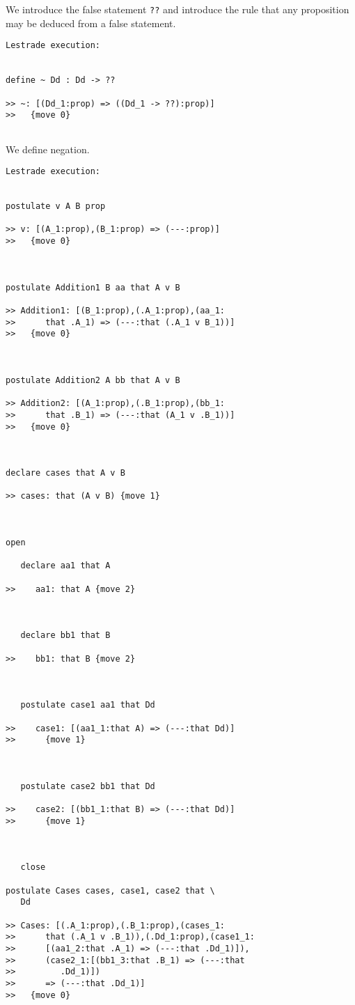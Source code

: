 \documentclass[12pt]{article}
\begin{document}
We introduce the false statement {\tt ??} and introduce the rule that any proposition may be deduced from a false statement.

\begin{verbatim}Lestrade execution:


define ~ Dd : Dd -> ??

>> ~: [(Dd_1:prop) => ((Dd_1 -> ??):prop)]
>>   {move 0}


\end{verbatim}

We define negation.

\begin{verbatim}Lestrade execution:


postulate v A B prop

>> v: [(A_1:prop),(B_1:prop) => (---:prop)]
>>   {move 0}



postulate Addition1 B aa that A v B

>> Addition1: [(B_1:prop),(.A_1:prop),(aa_1:
>>      that .A_1) => (---:that (.A_1 v B_1))]
>>   {move 0}



postulate Addition2 A bb that A v B

>> Addition2: [(A_1:prop),(.B_1:prop),(bb_1:
>>      that .B_1) => (---:that (A_1 v .B_1))]
>>   {move 0}



declare cases that A v B

>> cases: that (A v B) {move 1}



open

   declare aa1 that A

>>    aa1: that A {move 2}



   declare bb1 that B

>>    bb1: that B {move 2}



   postulate case1 aa1 that Dd

>>    case1: [(aa1_1:that A) => (---:that Dd)]
>>      {move 1}



   postulate case2 bb1 that Dd

>>    case2: [(bb1_1:that B) => (---:that Dd)]
>>      {move 1}



   close

postulate Cases cases, case1, case2 that \
   Dd

>> Cases: [(.A_1:prop),(.B_1:prop),(cases_1:
>>      that (.A_1 v .B_1)),(.Dd_1:prop),(case1_1:
>>      [(aa1_2:that .A_1) => (---:that .Dd_1)]),
>>      (case2_1:[(bb1_3:that .B_1) => (---:that
>>         .Dd_1)])
>>      => (---:that .Dd_1)]
>>   {move 0}


\end{verbatim}
\end{document}
